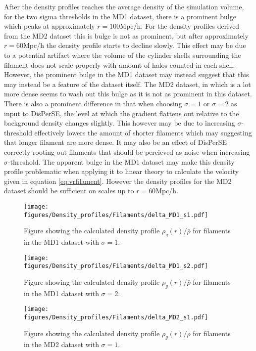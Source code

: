 After the density profiles reaches the average density of the simulation volume, for the two sigma thresholds in the MD1 dataset, there is a prominent bulge which peaks at approximately $r=100$Mpc/h. For the density profiles derived from the MD2 dataset this is bulge is not as prominent, but after approximately $r=60$Mpc/h the density profile starts to decline slowly. This effect may be due to a potential artifact where the volume of the cylinder shells surrounding the filament does not scale properly with amount of halos counted in each shell. However, the prominent bulge in the MD1 dataset may instead suggest that this may instead be a feature of the dataset itself. The MD2 dataset, in which is a lot more dense seems to wash out this bulge as it is not as prominent in this dataset. There is also a prominent difference in that when choosing $\sigma=1$ or $\sigma=2$ as input to DisPerSE, the level at which the gradient flattens out relative to the background density changes slightly. This however may be due to increasing $\sigma$-threshold effectively lowers the amount of shorter filaments which may suggesting that longer filament are more dense. It may also be an effect of DisPerSE correctly rooting out filaments that should be percieved as noise when increasing $\sigma$-threshold. The apparent bulge in the MD1 dataset may make this density profile problematic when applying it to linear theory to calculate the velocity given in equation \ref{eq:vrfilament}. However the density profiles for the MD2 dataset should be sufficient on scales up to $r=60$Mpc/h.
\begin{figure}[H]
    \texttt{[image: figures/Density\_profiles/Filaments/delta\_MD1\_s1.pdf]}
    \caption{Figure showing the calculated density profile $\rho_g(r)/\bar{\rho}$ for filaments in the MD1 dataset with $\sigma=1$.}
    \label{fig:fildensitytMD1s1}
\end{figure}

\begin{figure}[H]
    \texttt{[image: figures/Density\_profiles/Filaments/delta\_MD1\_s2.pdf]}
    \caption{Figure showing the calculated density profile $\rho_g(r)/\bar{\rho}$ for filaments in the MD1 dataset with $\sigma=2$.}
    \label{fig:fildensitytMD1s2}
\end{figure}

\begin{figure}[H]
    \texttt{[image: figures/Density\_profiles/Filaments/delta\_MD2\_s1.pdf]}
    \caption{Figure showing the calculated density profile $\rho_g(r)/\bar{\rho}$ for filaments in the MD2 dataset with $\sigma=1$.}
    \label{fig:fildensitytMD2s1}
\end{figure}

